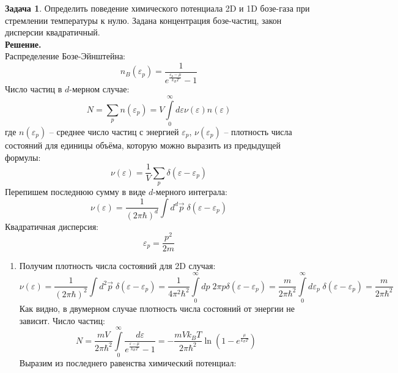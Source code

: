 \documentclass[12pt]{article}
\theoremstyle{definition}
\newtheorem{zad}{Задача}[section]
\begin{document}
\begin{zad}
Определить поведение химического потенциала 2D и 1D бозе-газа при стремлении температуры к нулю. Задана концентрация бозе-частиц, закон дисперсии квадратичный.\\
\textbf{Решение.}\\
Распределение Бозе-Эйнштейна:
\begin{equation}
    n_B(\varepsilon_p)=\frac{1}{e^{\frac{\varepsilon_p-\mu}{k_BT}}-1}
\end{equation}
Число частиц в $d$-мерном случае:
\begin{equation}
    N=\sum\limits_p n(\varepsilon_p)=V\int\limits_0^\infty d\varepsilon\nu(\varepsilon)n(\varepsilon)
\end{equation}
где $n(\varepsilon_p)$ -- среднее число частиц с энергией $\varepsilon_p$, $\nu(\varepsilon_p)$ -- плотность числа состояний для единицы объёма, которую можно выразить из предыдущей формулы:
\begin{equation}
    \nu(\varepsilon)=\frac{1}{V}\sum\limits_p\delta(\varepsilon-\varepsilon_p)
\end{equation}
Перепишем последнюю сумму в виде $d$-мерного интеграла:
\begin{equation}
    \nu(\varepsilon)=\frac{1}{(2\pi\hbar)^d}\int d^d\Vec{p}\;\delta(\varepsilon-\varepsilon_p)
\end{equation}
Квадратичная дисперсия:
\begin{equation}
    \varepsilon_p=\frac{p^2}{2m}
\end{equation}
\begin{enumerate}
    \item Получим плотность числа состояний для 2D случая:
\begin{equation}
    \nu(\varepsilon)=\frac{1}{(2\pi\hbar)^2}\int d^2\Vec{p}\;\delta(\varepsilon-\varepsilon_p)=\frac{1}{4\pi^2\hbar^2}\int\limits_0^\infty dp\;2\pi p\delta(\varepsilon-\varepsilon_p)=\frac{m}{2\pi\hbar^2}\int\limits_0^\infty d\varepsilon_p\;\delta(\varepsilon-\varepsilon_p)=\frac{m}{2\pi\hbar^2}
\end{equation}
Как видно, в двумерном случае плотность числа состояний от энергии не зависит. Число частиц:
\begin{equation}
    N=\frac{mV}{2\pi\hbar^2}\int\limits_0^\infty \frac{d\varepsilon}{e^{\frac{\varepsilon-\mu}{k_BT}}-1}=-\frac{mVk_BT}{2\pi\hbar^2}\ln\left(1-e^\frac{\mu}{k_BT}\right)
\end{equation}
Выразим из последнего равенства химический потенциал:
\begin{equation}

\end{equation}
\end{enumerate}
\end{zad}
\end{document}
